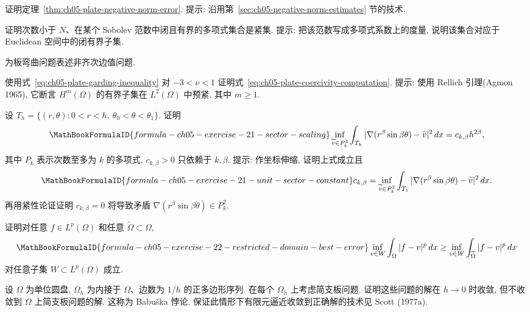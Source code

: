 \begin{MBExercise}
\label{exr:ch05-17}
证明定理~\ref{thm:ch05-plate-negative-norm-error}. 提示: 沿用第~\ref{sec:ch05-negative-norm-estimates} 节的技术.
\end{MBExercise}

\begin{MBExercise}
\label{exr:ch05-18}
证明次数小于 $N$、在某个 Sobolev 范数中闭且有界的多项式集合是紧集. 提示: 把该范数写成多项式系数上的度量, 说明该集合对应于 Euclidean 空间中的闭有界子集.
\end{MBExercise}

\begin{MBExercise}
\label{exr:ch05-19}
为板弯曲问题表述非齐次边值问题.
\end{MBExercise}

\begin{MBExercise}
\label{exr:ch05-20}
使用式~\eqref{eq:ch05-plate-garding-inequality} 对 $-3<\nu<1$ 证明式~\eqref{eq:ch05-plate-coercivity-computation}. 提示: 使用 Rellich 引理(Agmon 1965), 它断言 $H^m(\Omega)$ 的有界子集在 $L^2(\Omega)$ 中预紧, 其中 $m\geq1$.
\end{MBExercise}

\begin{MBExercise}
\label{exr:ch05-21}
设 $T_h=\{(r,\theta):0<r<h,\ \theta_0<\theta<\theta_1\}$. 证明
\[
\MathBookFormulaID{formula-ch05-exercise-21-sector-scaling}
\inf_{\widetilde v\in P_k^2}\int_{T_h}
|\nabla(r^\beta\sin\beta\theta)-\widetilde v|^2\,dx
=c_{k,\beta}h^{2\beta},
\]
其中 $P_k$ 表示次数至多为 $k$ 的多项式, $c_{k,\beta}>0$ 只依赖于 $k,\beta$. 提示: 作坐标伸缩, 证明上式成立且
\[
\MathBookFormulaID{formula-ch05-exercise-21-unit-sector-constant}
c_{k,\beta}=\inf_{\widetilde v\in P_k^2}\int_{T_1}
|\nabla(r^\beta\sin\beta\theta)-\widetilde v|^2\,dx.
\]
再用紧性论证证明 $c_{k,\beta}=0$ 将导致矛盾 $\nabla(r^\beta\sin\beta\theta)\in P_k^2$.
\end{MBExercise}

\begin{MBExercise}
\label{exr:ch05-22}
证明对任意 $f\in L^p(\Omega)$ 和任意 $\widetilde\Omega\subset\Omega$,
\[
\MathBookFormulaID{formula-ch05-exercise-22-restricted-domain-best-error}
\inf_{v\in W}\int_\Omega|f-v|^p\,dx
\geq\inf_{v\in W}\int_{\widetilde\Omega}|f-v|^p\,dx
\]
对任意子集 $W\subset L^p(\Omega)$ 成立.
\end{MBExercise}

\begin{MBExercise}
\label{exr:ch05-23}
设 $\Omega$ 为单位圆盘, $\Omega_h$ 为内接于 $\Omega$、边数为 $1/h$ 的正多边形序列. 在每个 $\Omega_h$ 上考虑简支板问题. 证明这些问题的解在 $h\to0$ 时收敛, 但不收敛到 $\Omega$ 上简支板问题的解. 这称为 Babuška 悖论. 保证此情形下有限元逼近收敛到正确解的技术见 Scott (1977a).
\end{MBExercise}
